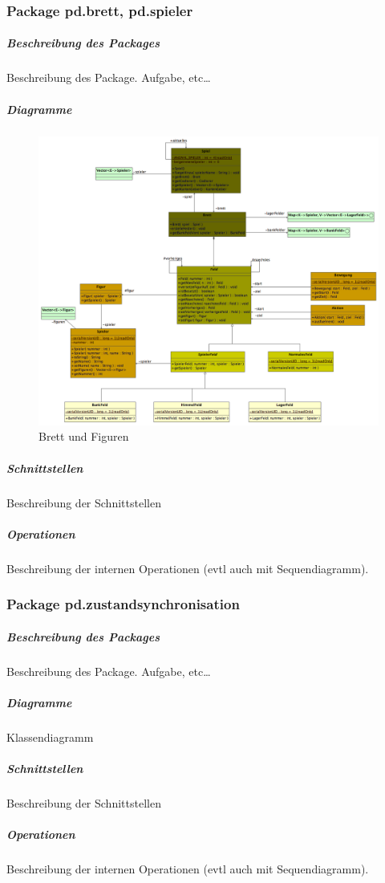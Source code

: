 \documentclass[a4paper,12pt,halfparskip,DIV14]{scrartcl}
\begin{document}
\newpage
\subsubsection{Package pd.brett, pd.spieler} %
\label{ssub:package_pd_brett}
\subparagraph{Beschreibung des Packages} %
\label{ssub:beschreibung_des_packages}
Beschreibung des Package. Aufgabe, etc…
\subparagraph{Diagramme} %
\label{ssub:diagramme}
\begin{figure}
	[htp] \centering 
	\includegraphics[width=1\textwidth]{pd_brett.png} \caption{Brett und Figuren}\label{fig:pd_brett.png} 
\end{figure}
\subparagraph{Schnittstellen} %
\label{ssub:schnittstellen}
Beschreibung der Schnittstellen
\subparagraph{Operationen} %
\label{ssub:operationen}
Beschreibung der internen Operationen (evtl auch mit Sequendiagramm).

\newpage
\subsubsection{Package pd.zustandsynchronisation} %
\label{ssub:package_pd_zustandsynchronisation}
\subparagraph{Beschreibung des Packages} %
\label{ssub:beschreibung_des_packages}
Beschreibung des Package. Aufgabe, etc…
\subparagraph{Diagramme} %
\label{ssub:diagramme}
Klassendiagramm
\subparagraph{Schnittstellen} %
\label{ssub:schnittstellen}
Beschreibung der Schnittstellen
\subparagraph{Operationen} %
\label{ssub:operationen}
Beschreibung der internen Operationen (evtl auch mit Sequendiagramm).
\end{document}
